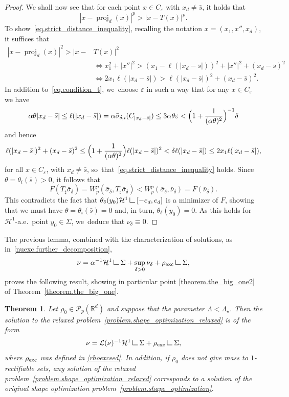 \documentclass[JEP,XML,SOM,Unicode,NoFloatCountersInSection,published]{cedram}
\newtheorem{theorem}{Theorem}[section]
\theoremstyle{definition}
\newcommand\LM[1]{\hbox{\vrule width.5pt \vbox to#1pt{\vfill \hrule width#1pt height.5pt}}}
\newcommand\LL{{\mathchoice {\>\LM7\>}{\>\LM7\>}{\,\LM5\,}{\,\LM{3.35}\,}}}
\newcommand{\mres}{\LL}
\newcommand\cH{\mathcal{H}}
\newcommand{\RR}{\mathbb{R}}
\DeclareMathOperator{\proj}{proj}
\newcommand{\rhoexc}{\rho_{\textup{exc}}}
\begin{document}
\begin{proof}
We shall now see that for each point $x \in C_\varepsilon$ with $x_d\neq \bar s$, it holds that
\begin{equation}\label{eq.strict_distance_inequality}
|x - \proj_d(x)|^p > |x - T(x)|^p.
\end{equation}
To show~\eqref{eq.strict_distance_inequality}, recalling the notation $x = (x_1, x'', x_d)$, it suffices that
\begin{align*}
|x - \proj_d(x)|^2 > |x- & T(x)|^2
\\
&\iff
x_1^2 + |x''|^2 >
(x_1-\ell(|x_d-\bar s|))^2+|x''|^2 + (x_d-\bar s)^2\\
&\iff
2x_1\ell(|x_d-\bar s|) > \ell(|x_d-\bar s|)^2 + (x_d-\bar s)^2.
\end{align*}
In addition to~\eqref{eq.condition_t}, we~choose $\varepsilon$ in such a way that for any $x \in C_\varepsilon$ we have
\[ \alpha\theta |x_d-\bar s|
\le
\ell(|x_d-\bar s|) = \alpha \bar \sigma_{\delta, i}(C_{|x_d-\bar s|})
\le 3\alpha\theta\varepsilon < \Bigl(1 +\frac{1}{(\alpha\theta)^2}\Bigr)^{-1}\delta
\]
and hence
\[
\ell(|x_d-\bar s|)^2+(x_d-\bar s)^2 \le
\Bigl(1 + \frac{1}{(\alpha\theta)^2} \Bigr)
\ell(|x_d-\bar s|)^2
< \delta \ell(|x_d-\bar s|)
\le 2x_1 \ell(|x_d-\bar s|),
\]
for all $x \in C_{\varepsilon}$, with $x_d \neq \bar s$, so~that~\eqref{eq.strict_distance_inequality} holds.
Since $\theta=\theta_i(\bar s)>0$, it follows that
\[
F(T_\sharp \bar \sigma_{\delta})=
W_p^p(\bar \sigma_{\delta} , T_\sharp\bar \sigma_{\delta})
<
W_p^p(\bar \sigma_{\delta}, \bar \nu_{\delta})
=
F(\bar \nu_{\delta}).
\]
This contradicts the fact that $\theta_\delta(y_0) \cH^1\mres [-e_d, e_d]$ is a minimizer of $F$, showing that we must have $\theta=\theta_i(\bar s)=0$ and, in turn, $\theta_\delta(y_0)=0$.
As this holds for $\cH^1$-a.e.~point $y_0 \in \Sigma$, we~deduce that $\nu_\delta \equiv 0$.
\end{proof}

The previous lemma, combined with the characterization of solutions, as in~\eqref{nuexc.further_decomposition},
\[
\nu = \alpha^{-1}\cH^1\mres \Sigma + \sup_{\delta > 0}\nu_\delta + \rhoexc\mres \Sigma,
\]
proves the following result, showing in particular point \eqref{theorem.the_big_one2} of Theorem~\ref{theorem.the_big_one}.

\begin{theorem}\label{theorem.inR2_density_is_1}
Let $\rho_0 \in \mathcal{P}_p(\RR^d)$ and suppose that the parameter $\Lambda < \Lambda_\star$. Then the solution to the relaxed problem~\eqref{problem.shape_optimization_relaxed} is of the form
\[
\nu =
\mathcal{L}(\nu)^{-1}\cH^1\mres \Sigma
+
\rhoexc\mres \Sigma,
\]
where $\rhoexc$ was defined in \eqref{rhoexceed}.
In addition, if $\rho_0$ does not give mass to $1$-rectifiable sets, any solution of the relaxed problem~\eqref{problem.shape_optimization_relaxed} corresponds to a solution of the original shape optimization problem~\eqref{problem.shape_optimization}.
\end{theorem}
\end{document}
